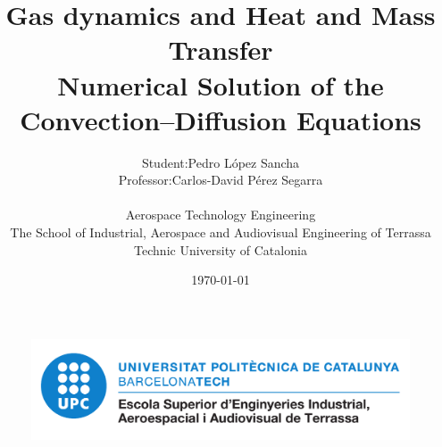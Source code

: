 
\title{
    \LARGE
    \textbf{Gas dynamics and Heat and Mass Transfer}\\
    \textbf{\large{Numerical Solution of the Convection--Diffusion Equations}}\\
}

\author{
    \begin{tabular}{rl}
    	\vspace{4mm}
        Student: 		& Pedro López Sancha 			\\
        Professor:  	& Carlos-David Pérez Segarra 	\\
    \end{tabular}
    \vspace{1cm} \\
    Aerospace Technology Engineering \\
    \vspace{0.1cm}
    The School of Industrial, Aerospace and Audiovisual Engineering of Terrassa \\
    \vspace{0.1cm}
    Technic University of Catalonia \\
    \vspace{0.5cm} 
}

\date{\today}

\begin{titlepage}
	\vspace*{\fill}
    \begin{center}
        \thetitle
        \vspace{1cm}
        \large{\theauthor}
        \thedate
    \end{center}
	\begin{figure}[ht]
		\centering
		\includegraphics[width=0.6\linewidth]{figures/00_general/logo_eseiaat.pdf}
	\end{figure}
    \vspace*{\fill}
\end{titlepage}


